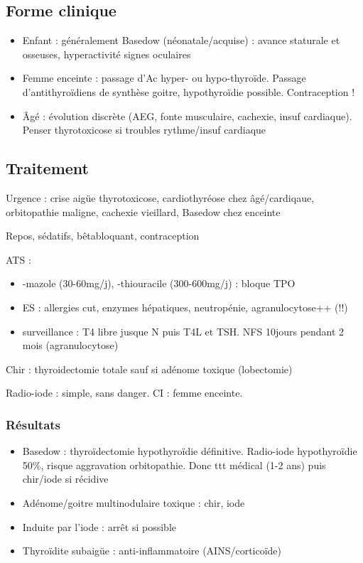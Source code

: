 \documentclass[11pt]{article}
\begin{document}
\subsection{Forme clinique}
\label{sec:orgab08754}
\begin{itemize}
\item Enfant : généralement Basedow (néonatale/acquise) : avance staturale et
osseuses, hyperactivité \textpm{} signes oculaires
\item Femme enceinte : passage d'Ac \thus hyper- ou hypo-thyroïde. Passage
d'antithyroïdiens de synthèse \thus goitre, hypothyroïdie possible. Contraception !
\item Âgé : évolution discrète (AEG, fonte musculaire, cachexie, insuf
cardiaque). Penser thyrotoxicose si troubles rythme/insuf cardiaque
\end{itemize}

\subsection{Traitement}
\label{sec:org4ab6bbb}
\skull{} Urgence : crise aigüe thyrotoxicose, cardiothyréose chez âgé/cardiqaue,
orbitopathie maligne, cachexie vieillard, Basedow chez \female{} enceinte

Repos, sédatifs, bêtabloquant, contraception

\gls{ATS} :
\begin{itemize}
\item -mazole (30-60mg/j), -thiouracile (300-600mg/j) : bloque TPO
\item ES : allergies cut, \inc enzymes hépatiques, neutropénie, agranulocytose++
(\skull !!)
\item surveillance : T4 libre jusque N puis T4L et TSH. NFS 10jours pendant 2 mois (agranulocytose)
\end{itemize}

Chir : thyroidectomie totale sauf si adénome toxique (lobectomie)

Radio-iode : simple, sans danger. CI : femme enceinte.

\subsubsection{Résultats}
\label{sec:org48bc5fc}
\begin{itemize}
\item Basedow : thyroïdectomie \thus hypothyroïdie définitive. Radio-iode \thus
hypothyroïdie 50\%, risque aggravation orbitopathie. Donc ttt médical (1-2
ans) puis chir/iode si récidive
\item Adénome/goitre multinodulaire toxique : chir, iode
\item Induite par l'iode : arrêt si possible
\item Thyroïdite subaigüe : anti-inflammatoire (AINS/corticoïde)
\end{itemize}
\end{document}
